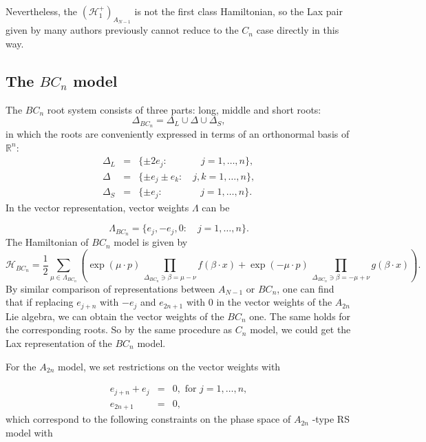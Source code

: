 \documentclass[a4paper,12pt]{article}
\begin{document}
Nevertheless, the $(\mathcal{H}_{1}^{+})_{A_{N-1}}$ is not
the first class Hamiltonian, so the Lax pair given by many
authors previously cannot reduce to the $C_{n}$ case
directly in this way.

\subsection{The $BC_{n}$ model}

The $BC_{n}$ root system consists of three parts: long,
middle and short roots:
\begin{equation}
\Delta _{BC_{n}}=\Delta _{L}\cup \Delta \cup \Delta _{S},  \label{bcnroot}
\end{equation}
in which the roots are conveniently expressed in terms of an
orthonormal basis of ${\mathbb R}^{n}$:
\begin{eqnarray}
\Delta _{L} &=&\{\pm 2e_{j}:\qquad \quad \ \ j=1,\ldots ,n\},  \nonumber \\
\Delta &=&\{\pm e_{j}\pm e_{k}:\quad j,k=1,\ldots ,n\}, \\
\Delta _{S} &=&\{\pm e_{j}:\qquad \quad \ \ \ \ j=1,\ldots ,n\}.  \nonumber
\end{eqnarray}
In the vector representation, vector weights $\Lambda $ can
be

\begin{equation}
\Lambda _{BC_{n}}=\{e_{j},-e_{j},0:\quad j=1,\ldots ,n\}.
\end{equation}
The Hamiltonian of $BC_{n}$ model is given by
\begin{equation}
\mathcal{H}_{BC_{n}}=\frac{1}{2}\sum_{\mu \in \Lambda _{BC_{n}}}\left( \exp
\left( \mu \cdot p\right) \,\prod_{\Delta _{BC_{n}}\ni \beta =\mu -\nu
}f(\beta \cdot x){+}\exp \left( -\mu \cdot p\right)
\,\prod_{\Delta
_{BC_{n}}\ni \beta =-\mu +\nu }g(\beta \cdot x)\right) .  \label{bcnhami}
\end{equation}
By similar comparison of representations between $A_{N-1}$
or $BC_{n}$, one can find that if replacing $e_{j+n}$ with
$-e_{j}$ and $e_{2n+1}$ with $0$ in the vector weights of
the $A_{2n}$ Lie algebra, we can obtain the vector weights
of the $BC_{n}$ one. The same holds for the corresponding
roots. So by the same procedure as $C_{n}$ model, we could
get the Lax representation of the $BC_{n}$ model.

For the $A_{2n}$ model, we set restrictions on the vector
weights with

\begin{eqnarray}
e_{j+n}+e_{j} &=&0,\mbox{\ \ \ for \ \ \ }j=1,\ldots ,n,
\nonumber \\ e_{2n+1} &=&0,
\end{eqnarray}
which correspond to the following constraints on the phase
space of $A_{2n}$
-type RS model with
\end{document}

